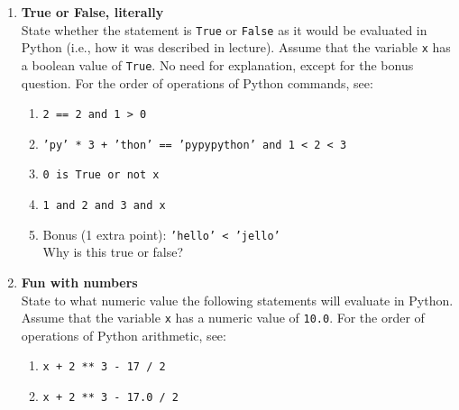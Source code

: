\documentclass{article}
\begin{document}
\begin{enumerate}
\item \textbf{True or False, literally} \\
State whether the statement is \texttt{True} or \texttt{False} as it would be evaluated in Python (i.e., how it was described in lecture).  Assume that the variable \texttt{x} has a boolean value of \texttt{True}.  No need for explanation, except for the bonus question.  For the order of operations of Python commands, see: %

\begin{enumerate}
\item \texttt{2 == 2 and 1 > 0}
\end{enumerate}

\begin{enumerate}
\setcounter{enumii}{1}
\item \texttt{'py' * 3 + 'thon' == 'pypypython' and 1 < 2 < 3}
\end{enumerate}

\begin{enumerate}
\setcounter{enumii}{2}
\item \texttt{0 is True or not x}
\end{enumerate}

\begin{enumerate}
\setcounter{enumii}{3}
\item \texttt{1 and 2 and 3 and x}
\end{enumerate}

\begin{enumerate}
\setcounter{enumii}{4}
\item Bonus (1 extra point):  \texttt{'hello' < 'jello'}  \\
Why is this true or false?
\end{enumerate}


\item \textbf{Fun with numbers} \\
State to what numeric value the following statements will evaluate in Python.  Assume that the variable \texttt{x} has a numeric value of \texttt{10.0}.  For the order of operations of Python arithmetic, see: %

\begin{enumerate}
\item \texttt{x + 2 ** 3 - 17 / 2}
\end{enumerate}

\begin{enumerate}
\setcounter{enumii}{1}
\item \texttt{x + 2 ** 3 - 17.0 / 2}
\end{enumerate}


\end{enumerate}
\end{document}
